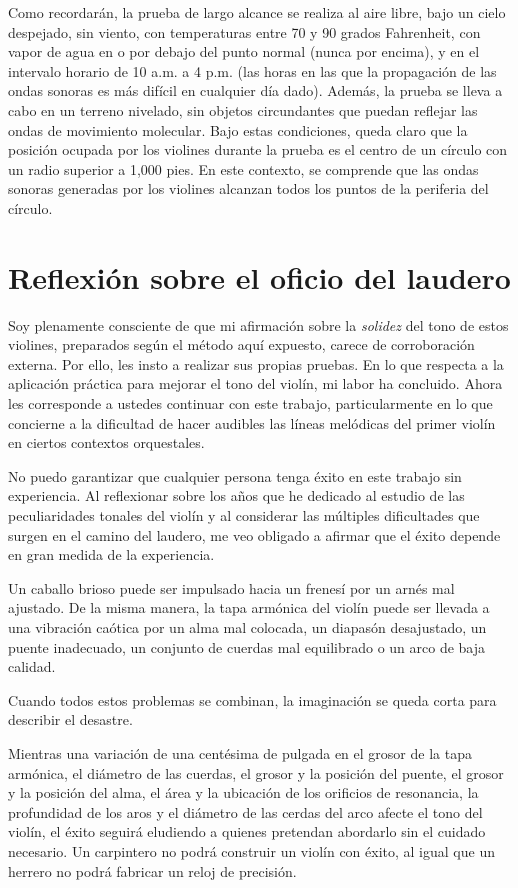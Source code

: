 \documentclass[12pt]{book}
\begin{document}
Como recordarán, la prueba de largo alcance se realiza al aire libre, bajo un cielo despejado, sin viento, con temperaturas entre 70 y 90 grados Fahrenheit, con vapor de agua en o por debajo del punto normal (nunca por encima), y en el intervalo horario de 10 a.m. a 4 p.m. (las horas en las que la propagación de las ondas sonoras es más difícil en cualquier día dado). Además, la prueba se lleva a cabo en un terreno nivelado, sin objetos circundantes que puedan reflejar las ondas de movimiento molecular. Bajo estas condiciones, queda claro que la posición ocupada por los violines durante la prueba es el centro de un círculo con un radio superior a 1,000 pies. En este contexto, se comprende que las ondas sonoras generadas por los violines alcanzan todos los puntos de la periferia del círculo.

\section*{Reflexión sobre el oficio del laudero}

Soy plenamente consciente de que mi afirmación sobre la \textit{solidez} del tono de estos violines, preparados según el método aquí expuesto, carece de corroboración externa. Por ello, les insto a realizar sus propias pruebas. En lo que respecta a la aplicación práctica para mejorar el tono del violín, mi labor ha concluido. Ahora les corresponde a ustedes continuar con este trabajo, particularmente en lo que concierne a la dificultad de hacer audibles las líneas melódicas del primer violín en ciertos contextos orquestales. 

No puedo garantizar que cualquier persona tenga éxito en este trabajo sin experiencia. Al reflexionar sobre los años que he dedicado al estudio de las peculiaridades tonales del violín y al considerar las múltiples dificultades que surgen en el camino del laudero, me veo obligado a afirmar que el éxito depende en gran medida de la experiencia.

Un caballo brioso puede ser impulsado hacia un frenesí por un arnés mal ajustado. De la misma manera, la tapa armónica del violín puede ser llevada a una vibración caótica por un alma mal colocada, un diapasón desajustado, un puente inadecuado, un conjunto de cuerdas mal equilibrado o un arco de baja calidad.

Cuando todos estos problemas se combinan, la imaginación se queda corta para describir el desastre. 

Mientras una variación de una centésima de pulgada en el grosor de la tapa armónica, el diámetro de las cuerdas, el grosor y la posición del puente, el grosor y la posición del alma, el área y la ubicación de los orificios de resonancia, la profundidad de los aros y el diámetro de las cerdas del arco afecte el tono del violín, el éxito seguirá eludiendo a quienes pretendan abordarlo sin el cuidado necesario. Un carpintero no podrá construir un violín con éxito, al igual que un herrero no podrá fabricar un reloj de precisión.
\end{document}
